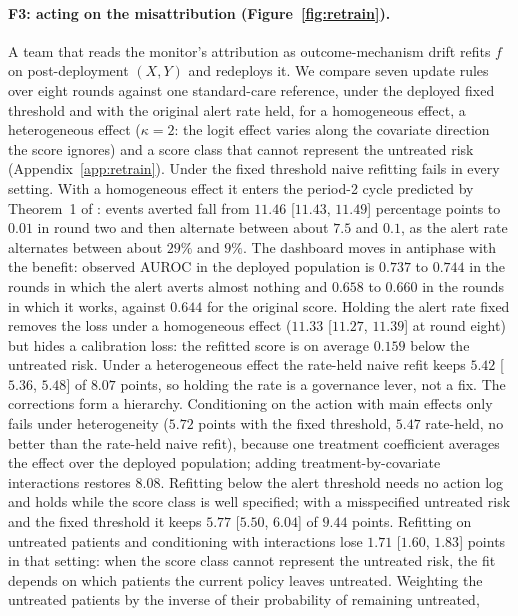 \documentclass[letterpaper]{article} %
\begin{document}
\paragraph{F3: acting on the misattribution (Figure~\ref{fig:retrain}).}
A team that reads the monitor's attribution as outcome-mechanism drift refits
$f$ on post-deployment $(X, Y)$ and redeploys it. We compare seven update
rules over eight rounds against one standard-care reference, under the
deployed fixed threshold and with the original alert rate held, for a
homogeneous effect, a heterogeneous effect ($\kappa = 2$: the logit effect
varies along the covariate direction the score ignores) and a score class that
cannot represent the untreated risk (Appendix~\ref{app:retrain}). Under the
fixed threshold naive refitting fails in every setting. With a homogeneous
effect it enters the period-2 cycle predicted by Theorem~1 of
\citet{liley2021model}: events averted fall from $11.46$ [$11.43$, $11.49$]
percentage points to $0.01$ in round two and then alternate between about
$7.5$ and $0.1$, as the alert rate alternates between about $29\%$ and $9\%$.
The dashboard moves in antiphase with the benefit: observed AUROC in the
deployed population is $0.737$ to $0.744$ in the rounds in which the alert
averts almost nothing and $0.658$ to $0.660$ in the rounds in which it works,
against $0.644$ for the original score. Holding the alert rate
fixed removes the loss under a homogeneous effect ($11.33$ [$11.27$, $11.39$]
at round eight) but hides a calibration loss: the refitted score is on average
$0.159$ below the untreated risk. Under a heterogeneous effect the rate-held
naive refit keeps $5.42$ [$5.36$, $5.48$] of $8.07$ points, so holding the rate
is a governance lever, not a fix. The corrections form a hierarchy. Conditioning
on the action with main effects only fails under heterogeneity ($5.72$ points
with the fixed threshold, $5.47$ rate-held, no better than the rate-held naive
refit), because one treatment coefficient averages the effect over the deployed
population; adding
treatment-by-covariate interactions restores $8.08$. Refitting below the alert
threshold needs no action log and holds while the score class is well
specified; with a misspecified untreated risk and the fixed threshold it keeps
$5.77$ [$5.50$, $6.04$] of $9.44$ points. Refitting on untreated patients and
conditioning with interactions lose $1.71$ [$1.60$, $1.83$] points in that
setting: when the score class cannot represent the untreated risk, the fit
depends on which patients the current policy leaves untreated. Weighting the
untreated patients by the inverse of their probability of remaining untreated,
\end{document}

